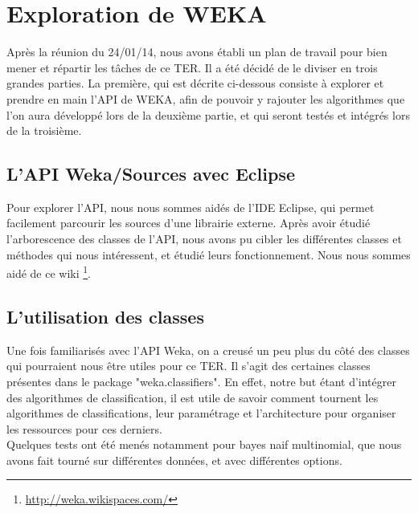 \documentclass{article}
\begin{document}

\section{Exploration de WEKA}
Après la réunion du 24/01/14, nous avons établi un plan de travail pour bien mener et répartir les tâches de ce TER. Il a été décidé de le diviser en trois grandes parties. La première, qui est décrite ci-dessous consiste à explorer et prendre en main l'API de WEKA, afin de pouvoir y rajouter les algorithmes que l'on aura développé lors de la deuxième partie, et qui seront testés et intégrés lors de la troisième.
\subsection{L'API Weka/Sources avec Eclipse}
Pour explorer l'API, nous nous sommes aidés de l'IDE Eclipse, qui permet facilement parcourir les sources d'une librairie externe. Après avoir étudié l'arborescence des classes de l'API, nous avons pu cibler les différentes classes et méthodes qui nous intéressent, et étudié leurs fonctionnement. Nous nous sommes aidé de ce wiki \footnote{\href{http://weka.wikispaces.com/}{http://weka.wikispaces.com/}}.

\subsection{L'utilisation des classes}
Une fois familiarisés avec l'API Weka, on a creusé un peu plus du côté des classes qui pourraient nous être utiles pour ce TER. Il s'agit des certaines classes présentes dans le package{\scriptsize { \normalsize "weka.classifiers"}}. En effet, notre but étant d'intégrer des algorithmes de classification, il est utile de savoir comment tournent les algorithmes de classifications, leur paramétrage et l'architecture pour organiser les ressources pour ces derniers.\\
Quelques tests ont été menés notamment pour bayes naif multinomial, que nous avons fait tourné sur différentes données, et avec différentes options.
\end{document}
